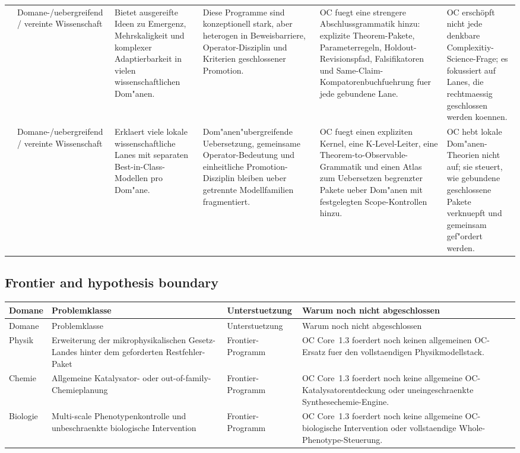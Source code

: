 \begin{longtable}{@{}L{0.17\textwidth}L{0.09\textwidth}L{0.17\textwidth}L{0.17\textwidth}L{0.20\textwidth}L{0.14\textwidth}@{}}
 & Domane-/\allowbreak uebergreifend / vereinte Wissenschaft & Bietet ausgereifte Ideen zu Emergenz, Mehrskaligkeit und komplexer Adaptierbarkeit in vielen wissenschaftlichen Dom"anen. & Diese Programme sind konzeptionell stark, aber heterogen in Beweisbarriere, Operator-Disziplin und Kriterien geschlossener Promotion. & OC fuegt eine strengere Abschlussgrammatik hinzu: explizite Theorem-Pakete, Parameterregeln, Holdout-Revisionspfad, Falsifikatoren und Same-Claim-Kompatorenbuchfuehrung fuer jede gebundene Lane. & OC erschöpft nicht jede denkbare Complexitiy-Science-Frage; es fokussiert auf Lanes, die rechtmaessig geschlossen werden koennen. \\
 & Domane-/\allowbreak uebergreifend / vereinte Wissenschaft & Erklaert viele lokale wissenschaftliche Lanes mit separaten Best-in-Class-Modellen pro Dom"ane. & Dom"anen"ubergreifende Uebersetzung, gemeinsame Operator-Bedeutung und einheitliche Promotion-Disziplin bleiben ueber getrennte Modellfamilien fragmentiert. & OC fuegt einen expliziten Kernel, eine K-Level-Leiter, eine Theorem-to-Observable-Grammatik und einen Atlas zum Uebersetzen begrenzter Pakete ueber Dom"anen mit festgelegten Scope-Kontrollen hinzu. & OC hebt lokale Dom"anen-Theorien nicht auf; sie steuert, wie gebundene geschlossene Pakete verknuepft und gemeinsam gef"ordert werden. \\
\bottomrule
\end{longtable}

\subsection{Frontier and hypothesis boundary}
\begin{longtable}{@{}L{0.11\textwidth}L{0.19\textwidth}L{0.14\textwidth}L{0.48\textwidth}@{}}
\toprule
Domane & Problemklasse & Unterstuetzung & Warum noch nicht abgeschlossen \\
\midrule
\endfirsthead
\toprule
Domane & Problemklasse & Unterstuetzung & Warum noch nicht abgeschlossen \\
\midrule
\endhead
Physik & Erweiterung der mikrophysikalischen Gesetz-Landes hinter dem geforderten Restfehler-Paket & Frontier-Programm & OC Core~1.3 foerdert noch keinen allgemeinen OC-Ersatz fuer den vollstaendigen Physikmodellstack. \\
Chemie & Allgemeine Katalysator- oder out-of-family-Chemieplanung & Frontier-Programm & OC Core~1.3 foerdert noch keine allgemeine OC-Katalysatorentdeckung oder uneingeschraenkte Synthesechemie-Engine. \\
Biologie & Multi-scale Phenotypenkontrolle und unbeschraenkte biologische Intervention & Frontier-Programm & OC Core~1.3 foerdert noch keine allgemeine OC-biologische Intervention oder vollstaendige Whole-Phenotype-Steuerung. \\
\bottomrule
\end{longtable}
\endgroup
